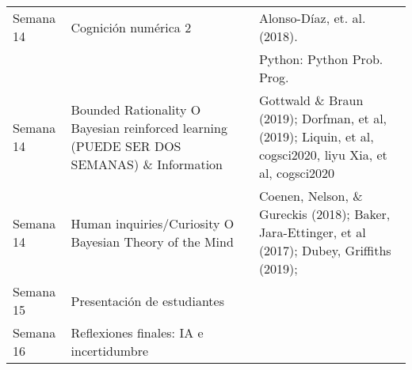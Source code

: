 \documentclass[letterpaper]{inzane_syllabus} %
\begin{document}
\begin{center}
\begin{tabularx}{\textwidth}{p{2cm}p{8cm}p{9.5cm}}
 \arrayrulecolor{maingray}\hline
Semana 14 & Cognici\'on num\'erica 2 & Alonso-Díaz, et. al. (2018). \\ & & Python: Python Prob. Prog. \\


\arrayrulecolor{maingray}\hline
Semana 14 & Bounded Rationality O Bayesian reinforced learning (PUEDE SER DOS SEMANAS) \& Information & Gottwald \& Braun (2019); Dorfman, et al, (2019); Liquin, et al, cogsci2020, liyu Xia, et al, cogsci2020 \\  

\arrayrulecolor{maingray}\hline
Semana 14 & Human inquiries/Curiosity O Bayesian Theory of the Mind  & Coenen, Nelson, \& Gureckis (2018); Baker, Jara-Ettinger, et al (2017); Dubey, Griffiths (2019);  \\  


\arrayrulecolor{maingray}\hline
Semana 15 & Presentaci\'on de estudiantes \\

\arrayrulecolor{maingray}\hline
Semana 16 & Reflexiones finales: IA e incertidumbre \\
\hline

\end{tabularx}
\end{center}


\end{document}
